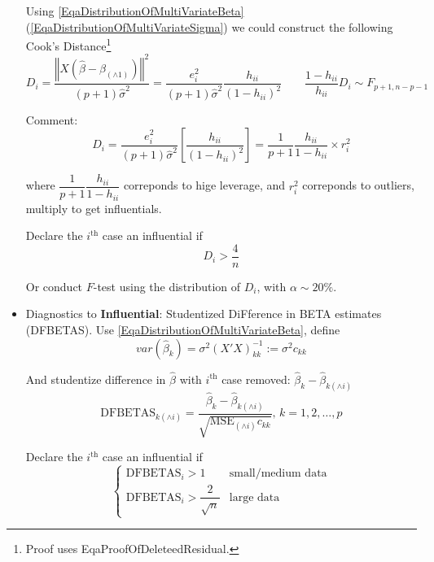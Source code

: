 \begin{itemize}[topsep=2pt,itemsep=0pt]
    Using \autoref{EqaDistributionOfMultiVariateBeta}(\autoref{EqaDistributionOfMultiVariateSigma}) we could construct the following Cook's Distance\footnote{Proof uses {EqaProofOfDeleteedResidual}.}
    \begin{equation}
         D_i=\dfrac{\left\Vert X(\hat{\beta} -\hat{\beta }_{(\wedge 1)})\right\Vert ^2}{(p+1)\hat{\sigma }^2}=\dfrac{e_i^2}{(p+1)\hat{\sigma }^2}\dfrac{h_{ii}}{(1-h_{ii})^2}\qquad \dfrac{1-h_{ii}}{h_{ii}}D_i\sim F_{p+1,n-p-1}
    \end{equation}
    
    Comment:
    \begin{equation}
        D_i=\dfrac{e_i^2}{(p+1)\hat{\sigma }^2}\left[ \dfrac{h_{ii}}{(1-h_{ii})^2} \right]=\dfrac{1}{p+1}\dfrac{h_{ii}}{1-h_{ii}}\times r_i^2
    \end{equation}

   where $ \dfrac{1}{p+1}\dfrac{h_{ii}}{1-h_{ii}} $ correponds to hige leverage, and $ r_{i}^2 $ correponds to outliers, multiply to get influentials.

   Declare the $ i^\mathrm{th}  $ case an {influential} if 
   \begin{equation}
       D_i>\dfrac{4}{n}
   \end{equation}
   
   Or conduct $ F $-test using the distribution of $ D_i $, with $ \alpha \sim 20\% $. 

   \item Diagnostics to \textbf{Influential}: Studentized DiFference in BETA estimates (DFBETAS). Use \autoref{EqaDistributionOfMultiVariateBeta}, define
   \begin{equation}
       var(\hat{\beta }_k)=\sigma ^2(X'X)^{-1}_{kk}:=\sigma ^2c_{kk} 
   \end{equation}
   
   And studentize difference in $ \hat{\beta } $ with $ i^\mathrm{th} $ case removed: $ \hat{\beta }_k-\hat{\beta }_{k(\wedge i)} $
   \begin{equation}
       \mathrm{DFBETAS}_{k(\wedge i)}=\dfrac{\hat{\beta }_k-\hat{\beta }_{k(\wedge i)}}{\sqrt{\mathrm{MSE}_{(\wedge i)}c_{kk} }},\,k=1,2,\ldots, p
   \end{equation}
   
   Declare the $ i^\mathrm{th}  $ case an {influential} if 
   \begin{equation}
    \begin{cases}
        \mathrm{DFBETAS}_i>1&\text{small/medium data} \\
        \mathrm{DFBETAS}_i>\dfrac{2}{\sqrt{n}}&\text{large data}
    \end{cases}   
   \end{equation}
   
   
   
   

\end{itemize}

